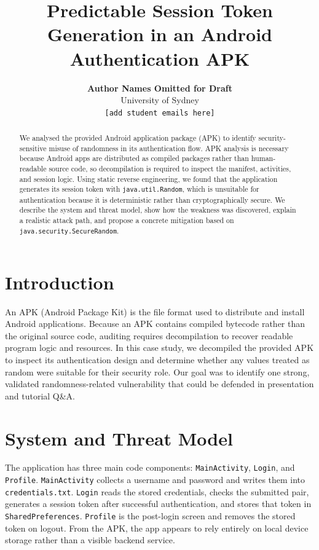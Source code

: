 \documentclass[letterpaper,twocolumn,10pt]{article}
\title{\Large Predictable Session Token Generation in an Android Authentication APK}
\author{
\textbf{Author Names Omitted for Draft}\\
University of Sydney\\
\texttt{[add student emails here]}
}
\begin{document}
\date{}
\maketitle

\begin{abstract}
We analysed the provided Android application package (APK) to identify security-sensitive misuse of randomness in its authentication flow. APK analysis is necessary because Android apps are distributed as compiled packages rather than human-readable source code, so decompilation is required to inspect the manifest, activities, and session logic. Using static reverse engineering, we found that the application generates its session token with \texttt{java.util.Random}, which is unsuitable for authentication because it is deterministic rather than cryptographically secure. We describe the system and threat model, show how the weakness was discovered, explain a realistic attack path, and propose a concrete mitigation based on \texttt{java.security.SecureRandom}.
\end{abstract}

\section{Introduction}
An APK (Android Package Kit) is the file format used to distribute and install Android applications. Because an APK contains compiled bytecode rather than the original source code, auditing requires decompilation to recover readable program logic and resources. In this case study, we decompiled the provided APK to inspect its authentication design and determine whether any values treated as random were suitable for their security role. Our goal was to identify one strong, validated randomness-related vulnerability that could be defended in presentation and tutorial Q\&A.

\section{System and Threat Model}
The application has three main code components: \texttt{MainActivity}, \texttt{Login}, and \texttt{Profile}. \texttt{MainActivity} collects a username and password and writes them into \texttt{credentials.txt}. \texttt{Login} reads the stored credentials, checks the submitted pair, generates a session token after successful authentication, and stores that token in \texttt{SharedPreferences}. \texttt{Profile} is the post-login screen and removes the stored token on logout. From the APK, the app appears to rely entirely on local device storage rather than a visible backend service.
\end{document}
